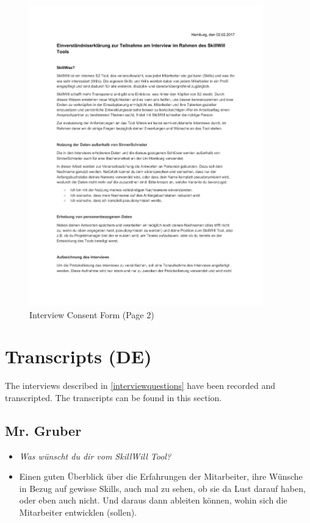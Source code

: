 \begin{appendices}
\begin{figure}[!h]
    \includegraphics[width=0.9\textwidth,page=2]{images/Interview_Consent.pdf}
    \caption[]{Interview Consent Form (Page 2)}
\end{figure}

\newpage

\section{Transcripts (DE)}
\label{transcripts}
The interviews described in \ref{interviewquestions} have been recorded and transcripted. The transcripts can be found in this section.

\subsection{Mr. Gruber}
\begin{itemize}
\item[] \textit{Was wünscht du dir vom SkillWill Tool?}
\item[] Einen guten Überblick über die Erfahrungen der Mitarbeiter, ihre Wünsche in Bezug auf gewisse Skills, auch mal zu sehen, ob sie da Lust darauf haben, oder eben auch nicht. Und daraus dann ableiten können, wohin sich die Mitarbeiter entwicklen (sollen).


\end{itemize}
\end{appendices}
